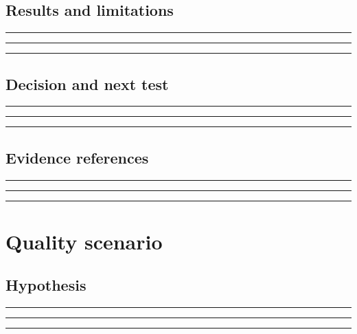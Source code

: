\documentclass[11pt]{article}
\begin{document}
\subsection{Results and limitations}
\noindent\rule{\linewidth}{0.35pt}\par\vspace{0.22in}
\noindent\rule{\linewidth}{0.35pt}\par\vspace{0.22in}
\noindent\rule{\linewidth}{0.35pt}\par\vspace{0.18in}

\subsection{Decision and next test}
\noindent\rule{\linewidth}{0.35pt}\par\vspace{0.22in}
\noindent\rule{\linewidth}{0.35pt}\par\vspace{0.22in}
\noindent\rule{\linewidth}{0.35pt}\par\vspace{0.18in}

\subsection{Evidence references}
\noindent\rule{\linewidth}{0.35pt}\par\vspace{0.22in}
\noindent\rule{\linewidth}{0.35pt}\par\vspace{0.22in}
\noindent\rule{\linewidth}{0.35pt}\par\vspace{0.18in}
\clearpage

\section{Quality scenario}

\subsection{Hypothesis}
\noindent\rule{\linewidth}{0.35pt}\par\vspace{0.22in}
\noindent\rule{\linewidth}{0.35pt}\par\vspace{0.22in}
\noindent\rule{\linewidth}{0.35pt}\par\vspace{0.18in}
\end{document}
